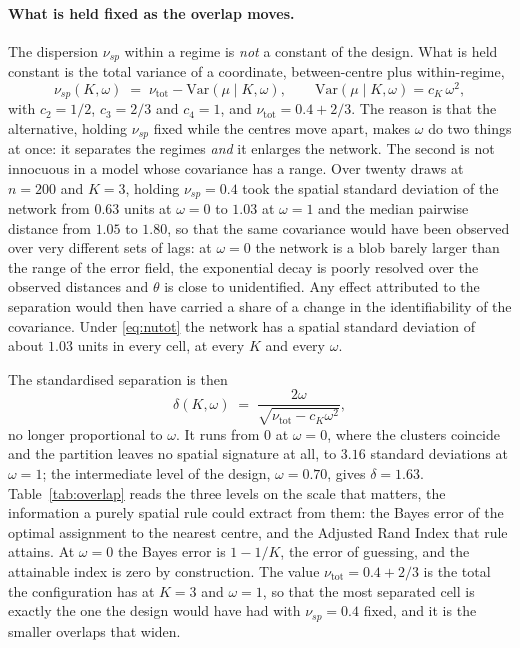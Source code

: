 \paragraph{What is held fixed as the overlap moves.} The dispersion $\nu_{sp}$ within a regime is \emph{not} a constant of the design. What is held constant is the total variance of a coordinate, between-centre plus within-regime,
\begin{equation}
  \nu_{sp}(K,\omega) \;=\; \nu_{\mathrm{tot}} - \mathrm{Var}(\mu \mid K, \omega),
  \qquad
  \mathrm{Var}(\mu \mid K, \omega) = c_K\,\omega^2 ,
  \label{eq:nutot}
\end{equation}
with $c_2 = 1/2$, $c_3 = 2/3$ and $c_4 = 1$, and $\nu_{\mathrm{tot}} = 0.4 + 2/3$. The reason is that the alternative, holding $\nu_{sp}$ fixed while the centres move apart, makes $\omega$ do two things at once: it separates the regimes \emph{and} it enlarges the network. The second is not innocuous in a model whose covariance has a range. Over twenty draws at $n=200$ and $K=3$, holding $\nu_{sp}=0.4$ took the spatial standard deviation of the network from $0.63$ units at $\omega=0$ to $1.03$ at $\omega=1$ and the median pairwise distance from $1.05$ to $1.80$, so that the same covariance would have been observed over very different sets of lags: at $\omega=0$ the network is a blob barely larger than the range of the error field, the exponential decay is poorly resolved over the observed distances and $\theta$ is close to unidentified. Any effect attributed to the separation would then have carried a share of a change in the identifiability of the covariance. Under \eqref{eq:nutot} the network has a spatial standard deviation of about $1.03$ units in every cell, at every $K$ and every $\omega$.

The standardised separation is then
\begin{equation}
  \delta(K,\omega) \;=\; \frac{2\omega}{\sqrt{\nu_{\mathrm{tot}} - c_K \omega^2}} ,
  \label{eq:sep}
\end{equation}
no longer proportional to $\omega$. It runs from $0$ at $\omega=0$, where the clusters coincide and the partition leaves no spatial signature at all, to $3.16$ standard deviations at $\omega=1$; the intermediate level of the design, $\omega = 0.70$, gives $\delta = 1.63$. Table~\ref{tab:overlap} reads the three levels on the scale that matters, the information a purely spatial rule could extract from them: the Bayes error of the optimal assignment to the nearest centre, and the Adjusted Rand Index that rule attains. At $\omega = 0$ the Bayes error is $1 - 1/K$, the error of guessing, and the attainable index is zero by construction. The value $\nu_{\mathrm{tot}} = 0.4 + 2/3$ is the total the configuration has at $K=3$ and $\omega=1$, so that the most separated cell is exactly the one the design would have had with $\nu_{sp} = 0.4$ fixed, and it is the smaller overlaps that widen.

